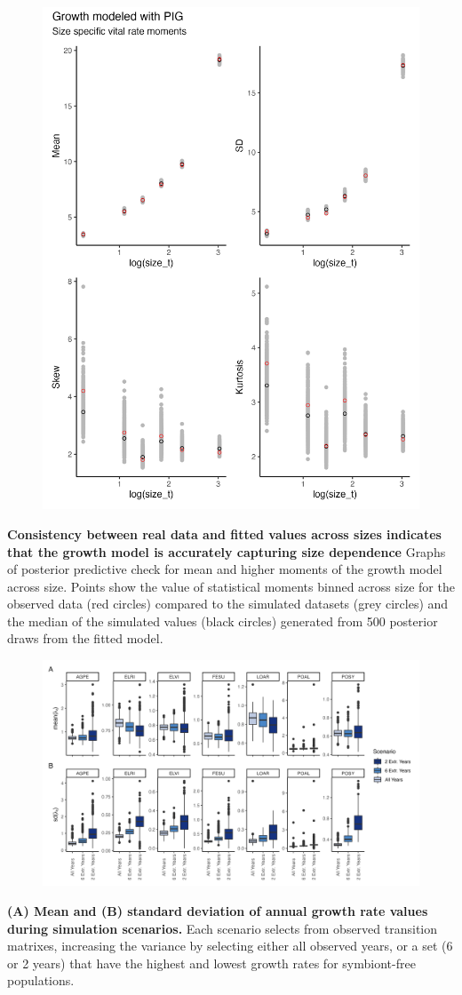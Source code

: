 \documentclass[12pt]{article}
\begin{document}
\begin{figure}
	\centering
	\includegraphics[width=.6\linewidth]{size_ppc_plot.png}
\end{figure}
 \textbf{Consistency between real data and fitted values across sizes indicates that the growth model is accurately capturing size dependence} Graphs of posterior predictive check for mean and higher moments of the growth model across size. Points show the value of statistical moments binned across size for the observed data (red circles) compared to the simulated datasets (grey circles) and the median of the simulated values (black circles) generated from 500 posterior draws from the fitted model. 
\newpage


\begin{figure}
	\centering
	\includegraphics[width=\linewidth]{sim_boxplots.png}
\end{figure}
 \textbf{(A) Mean and (B) standard deviation of annual growth rate values during simulation scenarios.} Each scenario selects from observed transition matrixes, increasing the variance by selecting either all observed years, or a set (6 or 2 years) that have the highest and lowest growth rates for symbiont-free populations.
\end{document}
